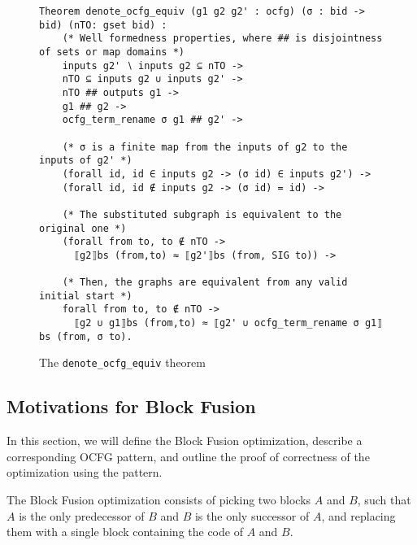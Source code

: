 \documentclass[11pt]{article}
\newcommand{\inlinecoq}[1]{\mbox{\lstinline[style=customcoq,columns=fixed,basewidth=.48em]{#1}}}
\newcommand{\ilc}[1]{\inlinecoq{#1}}
\newcommand{\ocfg}{OCFG\xspace}
\begin{document}


\begin{figure}
\begin{lstlisting}[style=customcoq,basicstyle=\small\ttfamily]
Theorem denote_ocfg_equiv (g1 g2 g2' : ocfg) (σ : bid -> bid) (nTO: gset bid) :
    (* Well formedness properties, where ## is disjointness of sets or map domains *)
    inputs g2' ∖ inputs g2 ⊆ nTO -> 
    nTO ⊆ inputs g2 ∪ inputs g2' -> 
    nTO ## outputs g1 ->
    g1 ## g2 -> 
    ocfg_term_rename σ g1 ## g2' ->

    (* σ is a finite map from the inputs of g2 to the inputs of g2' *)
    (forall id, id ∈ inputs g2 -> (σ id) ∈ inputs g2') ->
    (forall id, id ∉ inputs g2 -> (σ id) = id) ->

    (* The substituted subgraph is equivalent to the original one *)
    (forall from to, to ∉ nTO -> 
      ⟦g2⟧bs (from,to) ≈ ⟦g2'⟧bs (from, SIG to)) ->

    (* Then, the graphs are equivalent from any valid initial start *)
    forall from to, to ∉ nTO ->
      ⟦g2 ∪ g1⟧bs (from,to) ≈ ⟦g2' ∪ ocfg_term_rename σ g1⟧bs (from, σ to).
  \end{lstlisting}
  \caption{The \ilc{denote_ocfg_equiv} theorem}
  \label{fig:ocfg_equiv}
\end{figure}

\subsection{Motivations for Block Fusion}

In this section, we will define the Block Fusion optimization, describe a corresponding \ocfg pattern, and outline the proof of correctness of the optimization using the pattern.

The Block Fusion optimization consists of picking two blocks $A$ and $B$,
such that $A$ is the only predecessor of $B$ and $B$ is the only successor of $A$,
and replacing them with a single block containing the code of $A$ and $B$.
\end{document}

